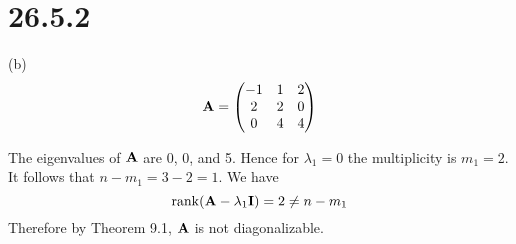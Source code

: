 \section*{26.5.2}
(b)
$${\bf A}=\left(\begin{matrix}
-1 & 1 & 2\cr
2 & 2 & 0\cr
0 & 4 & 4
\end{matrix}\right)
$$

\bigskip
\noindent
The eigenvalues of $\bf A$ are 0, 0, and 5.
Hence for $\lambda_1=0$ the multiplicity is $m_1=2$.
It follows that $n-m_1=3-2=1$.
We have
$$\mathop{\rm rank}({\bf A}-\lambda_1{\bf I})=2\ne n-m_1$$
Therefore by Theorem 9.1, $\bf A$ is not diagonalizable.
